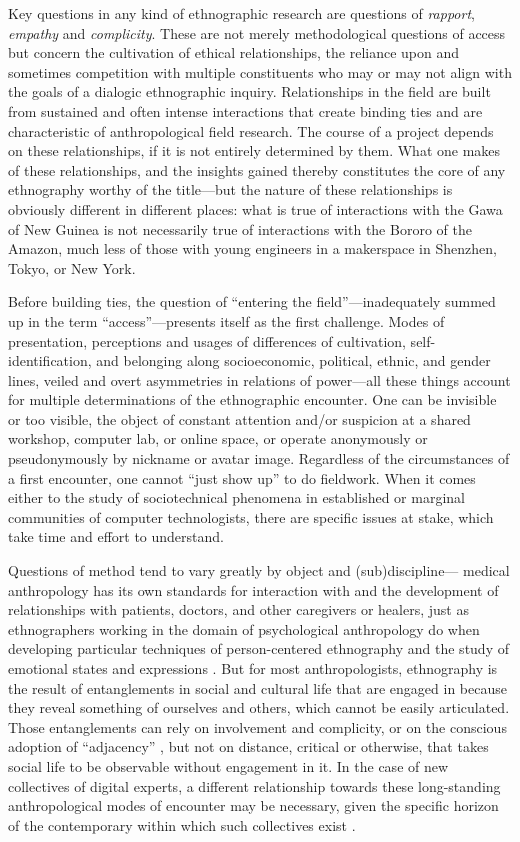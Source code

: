\documentclass[10pt,letter,oneside]{scrartcl}
\begin{document}
Key questions in any kind of ethnographic research are questions of
\emph{rapport}, \emph{empathy} and \emph{complicity}.  These are not
merely methodological questions of access but concern the cultivation
of ethical relationships, the reliance upon and sometimes competition
with multiple constituents who may or may not align with the goals of
a dialogic ethnographic inquiry. Relationships in the field are built
from sustained and often intense interactions that create binding ties
and are characteristic of anthropological field research. The course
of a project depends on these relationships, if it is not entirely
determined by them.  What one makes of these relationships, and the
insights gained thereby constitutes the core of any ethnography worthy
of the title---but the nature of these relationships is obviously
different in different places: what is true of interactions with the
Gawa of New Guinea is not necessarily true of interactions with the
Bororo of the Amazon, much less of those with young engineers in a
makerspace in Shenzhen, Tokyo, or New York.

Before building ties, the question of ``entering the
field''---inadequately summed up in the term ``access''---presents
itself as the first challenge.  Modes of presentation, perceptions and
usages of differences of cultivation, self-identification, and
belonging along socioeconomic, political, ethnic, and gender lines,
veiled and overt asymmetries in relations of power---all these things
account for multiple determinations of the ethnographic encounter. One
can be invisible or too visible, the object of constant attention
and/or suspicion at a shared workshop, computer lab, or online space,
or operate anonymously or pseudonymously by nickname or avatar image.
Regardless of the circumstances of a first encounter, one cannot
``just show up'' to do fieldwork.  When it comes either to the study
of sociotechnical phenomena in established or marginal communities of
computer technologists, there are specific issues at stake, which take
time and effort to understand.
  
Questions of method tend to vary greatly by object and
(sub)discipline--- medical anthropology has its own standards for
interaction with and the development of relationships with patients,
doctors, and other caregivers or healers, just as ethnographers
working in the domain of psychological anthropology do when developing
particular techniques of person-centered ethnography \cite{Hollan1992}
and the study of emotional states and expressions
\cite{Throop2009}. But for most anthropologists, ethnography is the
result of entanglements in social and cultural life that are engaged
in because they reveal something of ourselves and others, which cannot
be easily articulated. Those entanglements can rely on involvement and
complicity, or on the conscious adoption of ``adjacency''
\cite{Rabinow-MarkingTime}, but not on distance, critical or
otherwise, that takes social life to be observable without engagement
in it.  In the case of new collectives of digital experts, a different
relationship towards these long-standing anthropological modes of
encounter may be necessary, given the specific horizon of the
contemporary within which such collectives exist \cite{Rabinow2008}.
\end{document}
